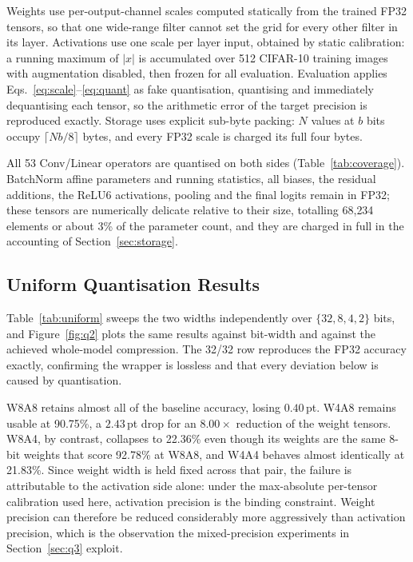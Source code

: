 \documentclass[10pt,a4paper]{article}
\begin{document}
Weights use per-output-channel scales computed statically from the trained FP32
tensors, so that one wide-range filter cannot set the grid for every other filter
in its layer. Activations use one scale per layer input, obtained by static
calibration: a running maximum of $|x|$ is accumulated over 512 CIFAR-10 training
images with augmentation disabled, then frozen for all evaluation. Evaluation
applies Eqs.~\eqref{eq:scale}--\eqref{eq:quant} as fake quantisation, quantising
and immediately dequantising each tensor, so the arithmetic error of the target
precision is reproduced exactly. Storage uses explicit sub-byte packing: $N$ values
at $b$ bits occupy $\lceil Nb/8 \rceil$ bytes, and every FP32 scale is charged its
full four bytes.

All 53 Conv/Linear operators are quantised on both sides
(Table~\ref{tab:coverage}). BatchNorm affine parameters and running statistics,
all biases, the residual additions, the ReLU6 activations, pooling and the final
logits remain in FP32; these tensors are numerically delicate relative to their
size, totalling 68{,}234 elements or about 3\% of the parameter count, and they
are charged in full in the accounting of Section~\ref{sec:storage}.

\TableCoverage

\subsection{Uniform Quantisation Results}
Table~\ref{tab:uniform} sweeps the two widths independently over
$\{32, 8, 4, 2\}$ bits, and Figure~\ref{fig:q2} plots the same results against
bit-width and against the achieved whole-model compression. The 32/32 row
reproduces the FP32 accuracy exactly, confirming the wrapper is lossless and that
every deviation below is caused by quantisation.

W8A8 retains almost all of the baseline accuracy, losing $0.40$\,pt. W4A8 remains
usable at 90.75\%, a $2.43$\,pt drop for an $8.00\times$ reduction of the weight
tensors. W8A4, by contrast, collapses to 22.36\% even though its weights are the
same 8-bit weights that score 92.78\% at W8A8, and W4A4 behaves almost identically
at 21.83\%. Since weight width is held fixed across that pair, the failure is
attributable to the activation side alone: under the max-absolute per-tensor
calibration used here, activation precision is the binding constraint. Weight
precision can therefore be reduced considerably more aggressively than activation
precision, which is the observation the mixed-precision experiments in
Section~\ref{sec:q3} exploit.
\end{document}
